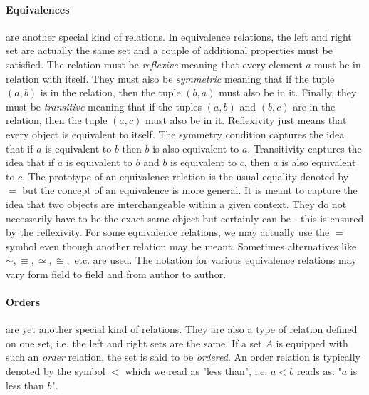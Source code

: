 \paragraph{Equivalences} are another special kind of relations. In equivalence relations, the left and right set are actually the same set and a couple of additional properties must be satisfied. The relation must be \emph{reflexive} meaning that every element $a$ must be in relation with itself. They must also be \emph{symmetric} meaning that if the tuple $(a,b)$ is in the relation, then the tuple $(b,a)$ must also be in it. Finally, they must be \emph{transitive} meaning that if the tuples $(a,b)$ and $(b,c)$ are in the relation, then the tuple $(a,c)$ must also be in it. Reflexivity just means that every object is equivalent to itself. The symmetry condition captures the idea that if $a$ is equivalent to $b$ then $b$ is also equivalent to $a$. Transitivity captures the idea that if $a$ is equivalent to $b$ and $b$ is equivalent to $c$, then $a$ is also equivalent to $c$. The prototype of an equivalence relation is the usual equality denoted by $=$ but the concept of an equivalence is more general. It is meant to capture the idea that two objects are interchangeable within a given context. They do not necessarily have to be the exact same object but certainly can be - this is ensured by the reflexivity. For some equivalence relations, we may actually use the $=$ symbol even though another relation may be meant. Sometimes alternatives like $\sim, \equiv, \simeq, \cong,$ etc. are used. The notation for various equivalence relations may vary form field to field and from author to author. 




\paragraph{Orders} are yet another special kind of relations. They are also a type of relation defined on one set, i.e. the left and right sets are the same. If a set $A$ is equipped with such an \emph{order} relation, the set is said to be \emph{ordered}. An order relation is typically denoted by the symbol $<$ which we read as "less than", i.e. $a < b$ reads as: "$a$ is less than $b$".

